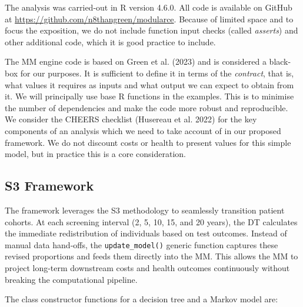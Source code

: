 \documentclass[
]{article}
\begin{document}
The analysis was carried-out in R version 4.6.0. All code is available
on GitHub at \url{https://github.com/n8thangreen/modularce}. Because of
limited space and to focus the exposition, we do not include function
input checks (called \emph{asserts}) and other additional code, which it
is good practice to include.

The MM engine code is based on Green et al. (2023) and is considered a
black-box for our purposes. It is sufficient to define it in terms of
the \emph{contract}, that is, what values it requires as inputs and what
output we can expect to obtain from it. We will principally use base R
functions in the examples. This is to minimise the number of
dependencies and make the code more robust and reproducible. We consider
the CHEERS checklist (Husereau et al. 2022) for the key components of an
analysis which we need to take account of in our proposed framework. We
do not discount costs or health to present values for this simple model,
but in practice this is a core consideration.

\subsection{S3 Framework}\label{s3-framework}

The framework leverages the S3 methodology to seamlessly transition
patient cohorts. At each screening interval (2, 5, 10, 15, and 20
years), the DT calculates the immediate redistribution of individuals
based on test outcomes. Instead of manual data hand-offs, the
\texttt{update\_model()} generic function captures these revised
proportions and feeds them directly into the MM. This allows the MM to
project long-term downstream costs and health outcomes continuously
without breaking the computational pipeline.

The class constructor functions for a decision tree and a Markov model
are:
\end{document}
